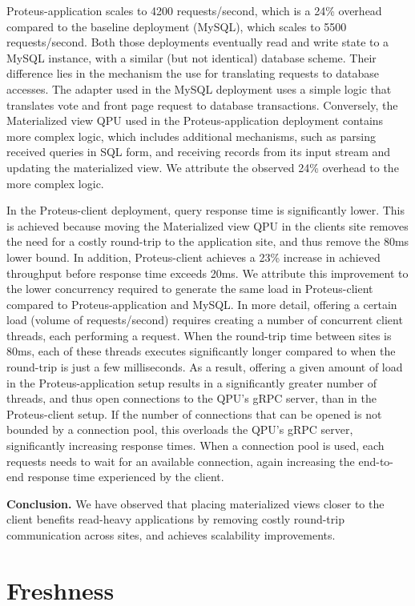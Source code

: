 Proteus-application scales to 4200 requests/second, which is a 24\% overhead compared to the baseline deployment (MySQL),
which scales to 5500 requests/second.
Both those deployments eventually read and write state to a MySQL instance, with a similar (but not identical) database scheme.
Their difference lies in the mechanism the use for translating requests to database accesses.
The adapter used in the MySQL deployment uses a simple logic that translates vote and front page request to database transactions.
Conversely, the  Materialized view QPU used in the Proteus-application deployment contains more complex logic,
which includes additional mechanisms,
such as parsing received queries in SQL form, and receiving records from its input stream and updating the materialized view.
We attribute the observed 24\% overhead to the more complex logic.

In the Proteus-client deployment, query response time is significantly lower.
This is achieved because moving the Materialized view QPU in the clients site removes the need for a costly round-trip to
the application site, and thus remove the 80ms lower bound.
In addition, Proteus-client achieves a 23\% increase in achieved throughput before response time exceeds 20ms.
We attribute this improvement to the lower concurrency required to generate the same load in Proteus-client
compared to Proteus-application and MySQL.
In more detail, offering a certain load (volume of requests/second) requires creating a number of concurrent client threads,
each performing a request.
When the round-trip time between sites is 80ms, each of these threads executes significantly longer compared to
when the round-trip is just a few milliseconds.
As a result, offering a given amount of load in the Proteus-application setup results in a significantly greater number
of threads, and thus open connections to the QPU's gRPC server, than in the Proteus-client setup.
If the number of connections that can be opened is not bounded by a connection pool, this overloads the QPU's gRPC server,
significantly increasing response times.
When a connection pool is used, each requests needs to wait for an available connection,
again increasing the end-to-end response time experienced by the client.

\medskip
\noindent
\textbf{Conclusion.} We have observed that placing materialized views closer to the client benefits read-heavy applications
by removing costly round-trip communication across sites, and achieves scalability improvements.


\section{Freshness}


